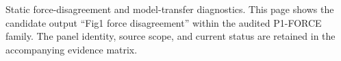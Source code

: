 Static force-disagreement and model-transfer diagnostics. This page shows the candidate output ``Fig1 force disagreement'' within the audited P1-FORCE family. The panel identity, source scope, and current status are retained in the accompanying evidence matrix.
